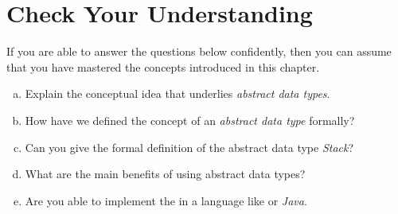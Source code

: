 \section{Check Your Understanding}
If you are able to answer the questions below confidently, then you can assume that you have mastered the concepts
introduced in this chapter.
\begin{enumerate}[(a)]
\item Explain the conceptual idea that underlies \emph{abstract data types}.
\item How have we defined the concept of an \emph{abstract data type} formally?
\item Can you give the formal definition of the abstract data type \textsl{Stack}?
\item What are the main benefits of using abstract data types?
\item Are you able to implement the  in a language like  or \textsl{Java}.
\end{enumerate}




